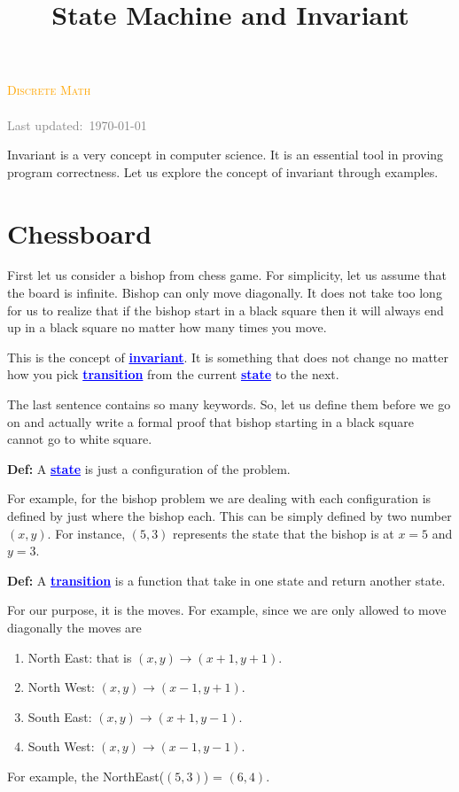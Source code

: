 \documentclass[a4paper, 12pt]{article}
\title{State Machine and Invariant}
\newcommand{\definition}{\vspace{1em}\noindent\textbf{Def:} }
\newcommand{\kwd}[1]{\textcolor{blue}{\textbf{\underline{#1}}}}
\theoremstyle{examplestyle}
\newcommand{\course}{Discrete Math}
\begin{document}
\begin{center}
	\textcolor{orange}{\textsc{\course}}\\
	\huge\textbf{\textsc{\thetitle}}\\
	\small\textcolor{gray}{Last updated:\, \today \, \currenttime}\\
\end{center}

\begin{multicols}{2}
Invariant is a very concept in computer science. It is an essential tool in proving program correctness. Let us explore the concept of invariant through examples.

\section*{Chessboard}



First let us consider a bishop from chess game. For simplicity, let us assume that the board is infinite. Bishop can only move diagonally. It does not take too long for us to realize that if the bishop start in a black square then it will always end up in a black square no matter how many times you move.

This is the concept of \kwd{invariant}. It is something that does not change no matter how you pick \kwd{transition} from the current \kwd{state} to the next.

The last sentence contains so many keywords. So, let us define them before we go on and actually write a formal proof that bishop starting in a black square cannot go to white square.

\definition A \kwd{state} is just a configuration of the problem.

For example, for the bishop problem we are dealing with each configuration is defined by just where the bishop each. This can be simply defined by two number $(x,y)$. For instance, $(5,3)$ represents the state that the bishop is at $x=5$ and $y=3$.

\definition A \kwd{transition} is a function that take in one state and return another state.

For our purpose, it is the moves. For example, since we are only allowed to move diagonally the moves are
\begin{enumerate}
	\item North East: that is $(x,y) \to (x+1, y+1)$.
	\item North West: $(x,y) \to (x-1, y+1)$.
	\item South East: $(x,y) \to (x+1, y-1)$.
	\item South West: $(x,y) \to (x-1, y-1)$.
\end{enumerate}
For example, the NorthEast($(5,3)$) = $(6,4)$.


\end{multicols}
\end{document}
